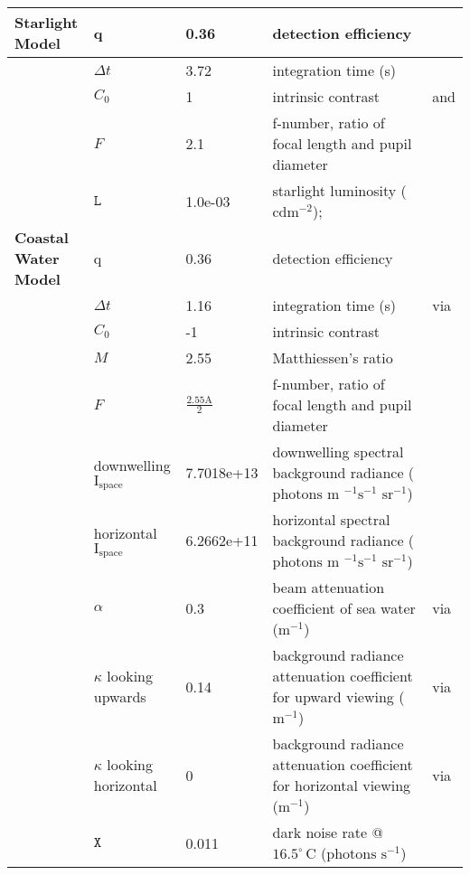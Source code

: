 \begin{tabular}{|L{3.5cm}|L{2cm}|L{2cm}|L{4.5cm}|L{4.5cm}|}
\textbf{Starlight Model}&q&0.36&detection efficiency&\cite{Nils14a}\\\hline
 &$\Delta t$&3.72&integration time (s)&\cite{Donn95a}\\\hline
 &$C_{0}$&1&intrinsic contrast&\cite{Hest68a} and \cite{Blac46a}\\\hline
 &$F$&2.1&f-number, ratio of focal length and pupil diameter&\cite{Mill79a}\\\hline
 &$\mathtt{L}$&1.0e-03&starlight luminosity ($\text{cd} \text{m}^{-2}$);&\cite{Midd52a}\\\hline
\textbf{Coastal Water Model}&q&0.36&detection efficiency&\cite{Nils14a}\\\hline
 &$\Delta t$&1.16&integration time (s)&\cite{Donn95a} via \cite{Nils14a}\\\hline
 &$C_{0}$&-1&intrinsic contrast&\cite{Nils14a}\\\hline
 &$M$&2.55&Matthiessen's ratio&\cite{Nils14a}\\\hline
 &$F$&$\frac{2.55\text{A}}{2}$&f-number, ratio of focal length and pupil diameter&\cite{Nils14a}\\\hline
 &downwelling $\text{I}_{\text{space}}$&7.7018e+13&downwelling spectral background radiance ($\text{photons } \text{m }^{-1} \text{s}^{-1} \text{ sr}^{-1}$)&\cite{Nils14a}\\\hline
 &horizontal $\text{I}_{\text{space}}$&6.2662e+11&horizontal spectral background radiance ($\text{photons } \text{m }^{-1} \text{s}^{-1} \text{ sr}^{-1}$)&\cite{Nils14a}\\\hline
 &$\alpha$&0.3&beam attenuation coefficient of sea water ($\text{m}^{-1}$)&\cite{John02a} via \cite{Nils14a}\\\hline
 &$\kappa$ looking upwards&0.14&background radiance attenuation coefficient for upward viewing ($\text{m}^{-1}$)&\cite{John02a} via \cite{Nils14a}\\\hline
 &$\kappa$ looking horizontal&0&background radiance attenuation coefficient for horizontal viewing ($\text{m}^{-1}$)&\cite{John02a} via \cite{Nils14a}\\\hline
 &$\mathtt{X}$&0.011&dark noise rate @$16.5^{\circ} \, \text{C}$ ($\text{photons } \text{s}^{-1}$)&\cite{Aho93a}\\\hline
\end{tabular}
